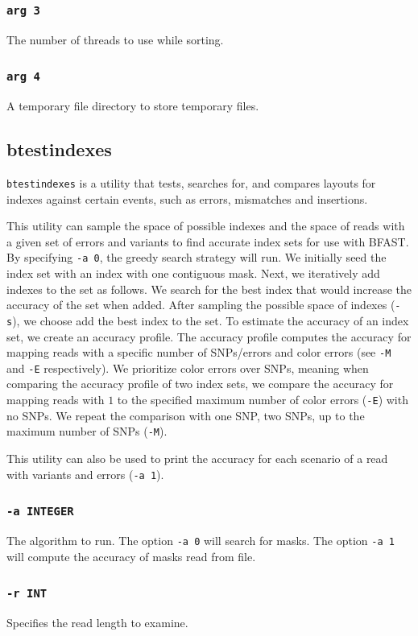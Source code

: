 \documentclass[a4paper,12pt]{book}
\newcommand{\TT}[1]{{\tt #1}} %
\begin{document}
\subsubsection{\TT{arg 3}}
The number of threads to use while sorting.
\subsubsection{\TT{arg 4}}
A temporary file directory to store temporary files.
\subsection{btestindexes}
\label{sec:btestindexes}
\TT{btestindexes} is a utility that tests, searches for, and compares layouts for indexes against certain events, such as errors, mismatches and insertions.

This utility can sample the space of possible indexes and the space of reads with a given set of errors and variants to find accurate index sets for use with BFAST.
By specifying \TT{-a 0}, the greedy search strategy will run.
We initially seed the index set with an index with one contiguous mask.
Next, we iteratively add indexes to the set as follows.
We search for the best index that would increase the accuracy of the set when added.
After sampling the possible space of indexes (\TT{-s}), we choose add the best index to the set.
To estimate the accuracy of an index set, we create an accuracy profile.
The accuracy profile computes the accuracy for mapping reads with a specific number of SNPs/errors and color errors (see \TT{-M} and \TT{-E} respectively).
We prioritize color errors over SNPs, meaning when comparing the accuracy profile of two index sets, we compare the accuracy for mapping reads with $1$ to the specified maximum number of color errors (\TT{-E}) with no SNPs.
We repeat the comparison with one SNP, two SNPs, up to the maximum number of SNPs (\TT{-M}).

This utility can also be used to print the accuracy for each scenario of a read with variants and errors (\TT{-a 1}). 

\subsubsection{\TT{-a INTEGER}}
The algorithm to run.
The option \TT{-a 0} will search for masks.
The option \TT{-a 1} will compute the accuracy of masks read from file.
\subsubsection{\TT{-r INT}}
Specifies the read length to examine.
\end{document}
